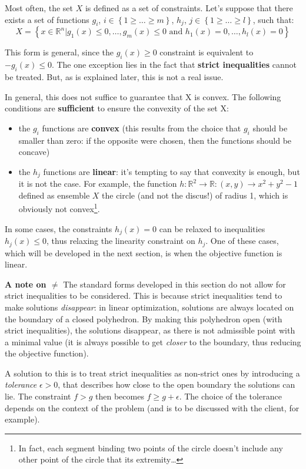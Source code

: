Most often, the set $X$ is defined as a set of constraints. Let's suppose that there exists a set of functions $g_i$, $i \in \left\{1 \geq \dots \geq m \right\}$, $h_j$, $j \in \left\{ 1 \geq \dots \geq l \right\}$, such that:
$$X = \left\{ x \in \mathbb{R}^n | g_1(x) \leq 0, \dots, g_m(x) \leq 0 \text{ and } h_1(x)=0, \dots, h_l(x) = 0 \right\}$$

This form is general, since the $g_i(x) \geq 0$ constraint is equivalent to $-g_i(x) \leq 0$. The one exception lies in the fact that \textbf{strict inequalities} cannot be treated. But, as is explained later, this is not a real issue. 

In general, this does not suffice to guarantee that X is convex. The following conditions are \textbf{sufficient} to ensure the convexity of the set X:
\begin{itemize}
\item the $g_i$ functions are \textbf{convex} (this results from the choice that $g_i$ should be smaller than zero: if the opposite were chosen, then the functions should be concave)
\item the $h_j$ functions are \textbf{linear}: it's tempting to say that convexity is enough, but it is not the case. For example, the function $h:\mathbb{R}^2\rightarrow \mathbb{R}: (x,y) \rightarrow x^2+y^2 -1$ defined as ensemble $X$ the circle (and not the discus!) of radius 1, which is obviously not convex\footnote{In fact, each segment binding two points of the circle doesn't include any other point of the circle that its extremity\dots}.
\end{itemize}

In some cases, the constraints $h_j(x)=0$ can be relaxed to inequalities $h_j(x)\leq0$, thus relaxing the linearity constraint on $h_j$. One of these cases, which will be developed in the next section, is when the objective function is linear.


\begin{framed}\label{note_on_diff}
\textbf{A note on $\neq$} The standard forms developed in this section do not allow for strict inequalities to be considered. This is because strict inequalities tend to make solutions \textit{disappear}: in linear optimization, solutions are always located on the boundary of a closed polyhedron. By making this polyhedron open (with strict inequalities), the solutions disappear, as there is not admissible point with a minimal value (it is always possible to get \textit{closer} to the boundary, thus reducing the objective function).

A solution to this is to treat strict inequalities as non-strict ones by introducing a \textit{tolerance} $\epsilon > 0$, that describes how close to the open boundary the solutions can lie. The constraint $f>g$ then becomes $f \geq g+\epsilon$. The choice of the tolerance depends on the context of the problem (and is to be discussed with the client, for example).
\end{framed}

